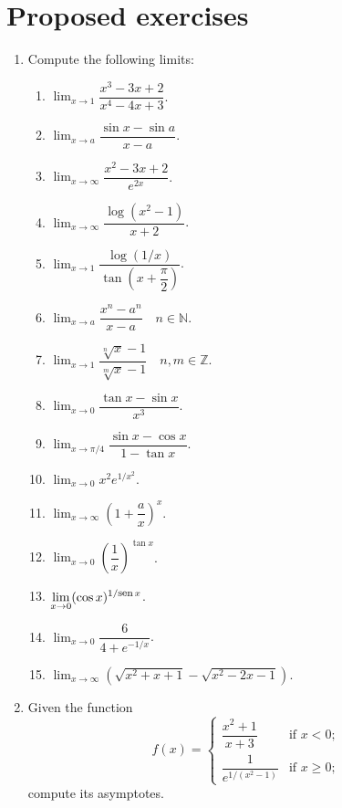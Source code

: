 \section{Proposed exercises}
\begin{enumerate}[leftmargin=*]
\item Compute the following limits:
      \begin{multicols}{2}
      \begin{enumerate}
      \item $\displaystyle \lim_{x\rightarrow 1}\dfrac{x^3-3x+2}{x^4-4x+3}$.
      \item $\displaystyle \lim_{x\rightarrow a}\dfrac{\sin x-\sin a}{x-a}$.
      \item $\displaystyle \lim_{x\rightarrow\infty}\dfrac{x^2-3x+2}{e^{2x}}$.
      \item $\displaystyle \lim_{x\rightarrow\infty}\dfrac{\log(x^2-1)}{x+2}$.
      \item $\displaystyle \lim_{x\rightarrow 1}\dfrac{\log(1/x)}{\tan(x+\dfrac{\pi}{2})}$.
      \item $\displaystyle \lim_{x\rightarrow a}\dfrac{x^n-a^n}{x-a}\quad n\in \mathbb{N}$.
      \item $\displaystyle \lim_{x\rightarrow 1}\dfrac{\sqrt[n]{x}-1}{\sqrt[m]{x}-1}\quad n,m \in \mathbb{Z}$.
      \item $\displaystyle \lim_{x\rightarrow 0}\dfrac{\tan x-\sin x}{x^3}$.
      \item $\displaystyle \lim_{x\rightarrow \pi/4}\dfrac{\sin x-\cos x}{1-\tan x}$.
      \item $\displaystyle \lim_{x\rightarrow 0}x^2e^{1/x^2}$.
      \item $\displaystyle \lim_{x\rightarrow \infty}\left(1+\dfrac{a}{x}\right)^x$.
      \item $\displaystyle \lim_{x\rightarrow 0}\left(\dfrac{1}{x}\right)^{\tan x}$.
      \item $\displaystyle \lim_{x\rightarrow 0}(\cos x)^{1/\mbox{\footnotesize sen}\, x}$.
      \item $\displaystyle \lim_{x\rightarrow 0}\dfrac{6}{4+e^{-1/x}}$.
      \item $\displaystyle \lim_{x\rightarrow \infty}\left(\sqrt{x^2+x+1}-\sqrt{x^2-2x-1}\right)$.
      \end{enumerate}
      \end{multicols}

\item Given the function
      \[
      f(x) =
      \begin{cases}
      \dfrac{x^2+1}{x+3}       & \mbox{if $x<0$};     \\
      \dfrac{1}{e^{1/(x^2-1)}} & \mbox{if $x\geq 0$;}
      \end{cases}
      \]
      compute its asymptotes.


\end{enumerate}

